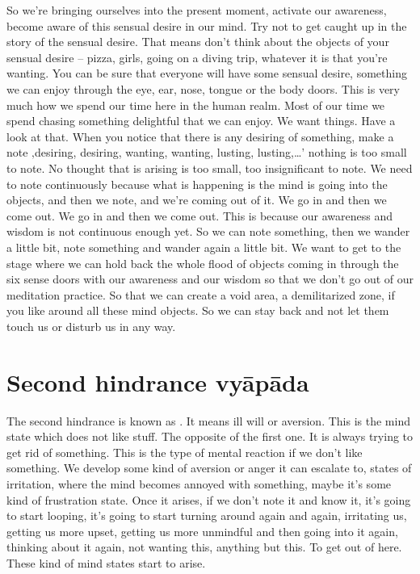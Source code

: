 \documentclass[letterpaper,10pt,english]{sphinxmanual}
\begin{document}
\sphinxAtStartPar
So  we’re  bringing  ourselves  into  the  present  moment,  activate  our
awareness, become aware of this sensual desire in our mind. Try not to get
caught up in the story of the sensual desire. That means don’t think about the
objects of your sensual desire – pizza, girls, going on a diving trip, whatever it is that you’re wanting. You can be sure that everyone will have some
sensual desire, something we can enjoy through the eye, ear, nose, tongue
or  the  body  doors. This  is  very  much  how  we  spend  our  time  here  in  the
human realm. Most of our time we spend chasing something delightful that
we  can  enjoy. We  want  things.  Have  a  look  at  that. When  you  notice  that
there is any desiring of something, make a note ‚desiring, desiring, wanting,
wanting, lusting, lusting,…’ nothing is too small to note. No thought that is
arising is too small, too insignificant to note. We need to note continuously
because  what  is  happening  is  the  mind  is  going  into  the  objects,  and  then
we note, and we’re coming out of it. We go in and then we come out. We go
in and then we come out. This is because our awareness and wisdom is not
continuous enough yet. So we can note something, then we wander a little
bit, note something and wander again a little bit. We want to get to the stage
where we can hold back the whole flood of objects coming in through the
six sense doors with our awareness and our wisdom so that we don’t go out
of our meditation practice. So that we can create a void area, a demilitarized
zone, if you like around all these mind objects. So we can stay back and not
let them touch us or disturb us in any way.


\section{Second hindrance vyāpāda}
\label{\detokenize{3-a:second-hindrance-vyapada}}
\sphinxAtStartPar
{} The second hindrance is known as
. It means ill will or aversion. This is the mind state which does not like stuff. The opposite of the first
one. It is always trying to get rid of something. This is the type of mental
reaction if we don’t like something. We develop some kind of aversion or
anger it can escalate to, states of irritation, where the mind becomes annoyed
with something, maybe it’s some kind of frustration state. Once it arises, if
we  don’t  note  it  and  know  it,  it’s  going  to  start  looping,  it’s  going  to  start
turning around again and again, irritating us, getting us more upset, getting
us more unmindful and then going into it again, thinking about it again, not
wanting this, anything but this. To get out of here. These kind of mind states
start to arise.
\end{document}
